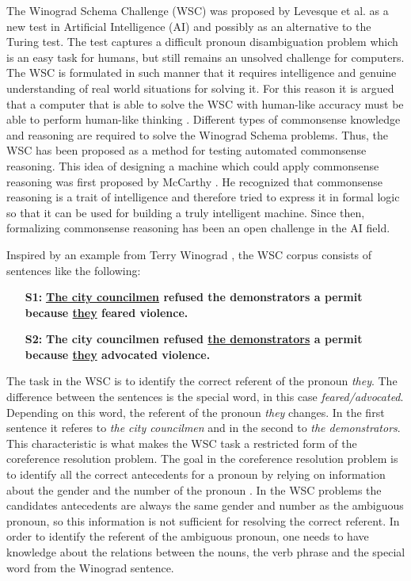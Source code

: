 \label{section:introduction}

The Winograd Schema Challenge (WSC) was proposed by Levesque et al. \cite{DBLP:conf/kr/LevesqueDM12} as a new test in Artificial Intelligence (AI) and possibly as an alternative to the Turing test. The test captures a difficult pronoun disambiguation problem which is an easy task for humans, but still remains an unsolved challenge for computers. The WSC is formulated in such manner that it requires intelligence and genuine understanding of real world situations for solving it. For this reason it is argued that a computer that is able to solve the WSC with human-like accuracy must be able to perform human-like thinking \cite{DBLP:conf/kr/LevesqueDM12}. 
Different types of commonsense knowledge and reasoning are required to solve the Winograd Schema problems. Thus, the WSC has been proposed as a method for testing automated commonsense reasoning. This idea of designing a  machine which could apply commonsense reasoning was first proposed by McCarthy \cite{McCarthy:1960:PCS:889202}. He recognized that commonsense reasoning is a trait of intelligence and therefore tried to express it in formal logic so that it can be used for building a truly intelligent machine. Since then, formalizing commonsense reasoning has been an open challenge in the AI field.   

Inspired by an example from Terry Winograd \cite{article}, the WSC corpus consists of sentences like the following:
\begin{itemize}
	\item[\textbf{S1:}] \textbf{\underline{The city councilmen} refused the demonstrators a permit because \underline{they} feared violence.}
	\item[\textbf{S2:}] \textbf{The city councilmen refused \underline{the demonstrators} a permit because \underline{they} advocated violence.}
\end{itemize}

The task in the WSC is to identify the correct referent of the pronoun \textit{they}. The difference between the sentences is the special word, in this case \textit{feared/advocated}. Depending on this word, the referent of the pronoun \textit{they} changes. In the first sentence it referes to \textit{the city councilmen} and in the second to \textit{the demonstrators}. This characteristic is what makes the WSC task a restricted form of the coreference resolution problem. The goal in the coreference resolution problem is to identify all the correct antecedents for a pronoun by relying on information about the gender and the number of the pronoun \cite{Coref}. In the WSC problems the candidates antecedents are always the same gender and number as the ambiguous pronoun, so this information is not sufficient for resolving the correct referent.
In order to identify the referent of the ambiguous pronoun, one needs to have knowledge about the relations between the nouns, the verb phrase and the special word from the Winograd sentence.

